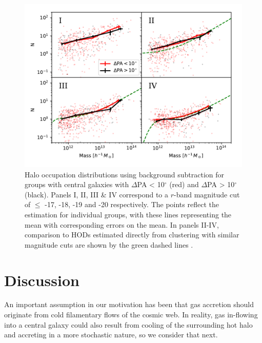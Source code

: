 \begin{figure}
	\includegraphics[width=\linewidth]{thesis/latex/halo_assembly_manga/hod_vs_zehavi.pdf}
    \caption[Halo occupation distributions using background subtraction for groups with central galaxies split on $\Delta$PA.]{Halo occupation distributions using background subtraction for groups with central galaxies with $\Delta$PA < 10$^{\circ}$ (red) and $\Delta$PA > 10$^{\circ}$ (black). Panels I, II, III \& IV correspond to a $r$-band magnitude cut of $\leq$ -17, -18, -19 and -20 respectively. The points reflect the estimation for individual groups, with these lines representing the mean with corresponding errors on the mean. In panels II-IV, comparison to HODs estimated directly from clustering with similar magnitude cuts are shown by the green dashed lines \citep[][see text]{zehavi2011}.}
    \label{fig:hod_mpl6}
\end{figure}

\section{Discussion} \label{sec:halo_assembly_discussion}
An important assumption in our motivation has been that gas accretion should originate from cold filamentary flows of the cosmic web. In reality, gas in-flowing into a central galaxy could also result from cooling of the surrounding hot halo and accreting in a more stochastic nature, so we consider that next. 

